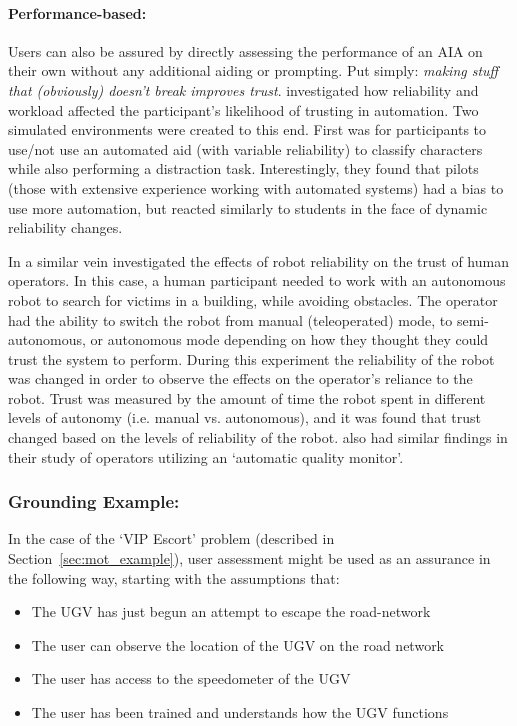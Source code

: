 \paragraph{Performance-based:}
Users can also be assured by directly assessing the performance of an AIA on their own without any additional aiding or prompting.  Put simply: \emph{making stuff that (obviously) doesn't break improves trust}. \citet{Riley1996-qm} investigated how reliability and workload affected the participant's likelihood of trusting in automation. Two simulated environments were created to this end. First was for participants to use/not use an automated aid (with variable reliability) to classify characters while also performing a distraction task. Interestingly, they found that pilots (those with extensive experience working with automated systems) had a bias to use more automation, but reacted similarly to students in the face of dynamic reliability changes.

In a similar vein \citet{Desai2012-rc} investigated the effects of robot reliability on the trust of human operators. In this case, a human participant needed to work with an autonomous robot to search for victims in a building, while avoiding obstacles. The operator had the ability to switch the robot from manual (teleoperated) mode, to semi-autonomous, or autonomous mode depending on how they thought they could trust the system to perform. During this experiment the reliability of the robot was changed in order to observe the effects on the operator's reliance to the robot. Trust was measured by the amount of time the robot spent in different levels of autonomy (i.e. manual vs. autonomous), and it was found that trust changed based on the levels of reliability of the robot. \citet{Yu2018-qw} also had similar findings in their study of operators utilizing an `automatic quality monitor'.

\subsubsection{Grounding Example:}
In the case of the `VIP Escort' problem (described in Section~\ref{sec:mot_example}), user assessment might be used as an assurance in the following way, starting with the assumptions that:

\begin{itemize}
    \item The UGV has just begun an attempt to escape the road-network
    \item The user can observe the location of the UGV on the road network
    \item The user has access to the speedometer of the UGV
    \item The user has been trained and understands how the UGV functions
\end{itemize}

